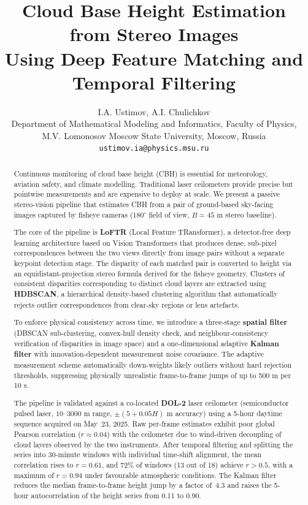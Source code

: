 \documentclass[11pt]{article}
\title{Cloud Base Height Estimation from Stereo Images\\ Using Deep Feature Matching and Temporal Filtering}
\author{I.A. Ustimov, A.I. Chulichkov\\[2mm]
\small Department of Mathematical Modeling and Informatics, Faculty of Physics,\\
M.V. Lomonosov Moscow State University, Moscow, Russia\\
\small \texttt{ustimov.ia@physics.msu.ru}}
\date{}
\begin{document}
\maketitle

\begin{abstract}

Continuous monitoring of cloud base height (CBH) is essential for meteorology, aviation safety, and climate modelling. Traditional laser ceilometers provide precise but pointwise measurements and are expensive to deploy at scale. We present a passive stereo-vision pipeline that estimates CBH from a pair of ground-based sky-facing images captured by fisheye cameras (180$^\circ$ field of view, $B = 45$ m stereo baseline).

The core of the pipeline is \textbf{LoFTR} (Local Feature TRansformer), a detector-free deep learning architecture based on Vision Transformers that produces dense, sub-pixel correspondences between the two views directly from image pairs without a separate keypoint detection stage. The disparity of each matched pair is converted to height via an equidistant-projection stereo formula derived for the fisheye geometry. Clusters of consistent disparities corresponding to distinct cloud layers are extracted using \textbf{HDBSCAN}, a hierarchical density-based clustering algorithm that automatically rejects outlier correspondences from clear-sky regions or lens artefacts.

To enforce physical consistency across time, we introduce a three-stage \textbf{spatial filter} (DBSCAN sub-clustering, convex-hull density check, and neighbour-consistency verification of disparities in image space) and a one-dimensional adaptive \textbf{Kalman filter} with innovation-dependent measurement noise covariance. The adaptive measurement scheme automatically down-weights likely outliers without hard rejection thresholds, suppressing physically unrealistic frame-to-frame jumps of up to 500 m per 10 s.

The pipeline is validated against a co-located \textbf{DOL-2} laser ceilometer (semiconductor pulsed laser, $10$--$3000$ m range, $\pm(5 + 0.05H)$ m accuracy) using a 5-hour daytime sequence acquired on May~23, 2025. Raw per-frame estimates exhibit poor global Pearson correlation ($r \approx 0.04$) with the ceilometer due to wind-driven decoupling of cloud layers observed by the two instruments. After temporal filtering and splitting the series into 30-minute windows with individual time-shift alignment, the mean correlation rises to $r = 0.61$, and $72\%$ of windows (13 out of 18) achieve $r > 0.5$, with a maximum of $r = 0.94$ under favourable atmospheric conditions. The Kalman filter reduces the median frame-to-frame height jump by a factor of~4.3 and raises the 5-hour autocorrelation of the height series from 0.11 to 0.90.


\end{abstract}
\end{document}
